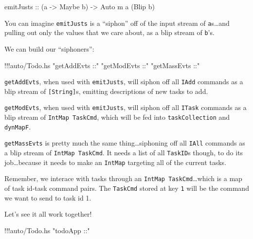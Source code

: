 \documentclass[]{article}
\newenvironment{Shaded}{}{}
\newcommand{\DataTypeTok}[1]{\textcolor[rgb]{0.56,0.13,0.00}{{#1}}}
\newcommand{\StringTok}[1]{\textcolor[rgb]{0.25,0.44,0.63}{{#1}}}
\newcommand{\OtherTok}[1]{\textcolor[rgb]{0.00,0.44,0.13}{{#1}}}
\newcommand{\FunctionTok}[1]{\textcolor[rgb]{0.02,0.16,0.49}{{#1}}}
\newcommand{\NormalTok}[1]{{#1}}
\begin{document}
\begin{Shaded}
\begin{Highlighting}[]
\OtherTok{emitJusts ::} \NormalTok{(a }\OtherTok{->} \DataTypeTok{Maybe} \NormalTok{b) }\OtherTok{->} \DataTypeTok{Auto} \NormalTok{m a (}\DataTypeTok{Blip} \NormalTok{b)}
\end{Highlighting}
\end{Shaded}

You can imagine \texttt{emitJusts} is a ``siphon'' off of the input
stream of \texttt{a}s\ldots{}and pulling out only the values that we
care about, as a blip stream of \texttt{b}'s.

We can build our ``siphoners'':

\begin{Shaded}
\begin{Highlighting}[]
\FunctionTok{!!!}\NormalTok{auto}\FunctionTok{/}\NormalTok{Todo.hs }\StringTok{"getAddEvts ::"} \StringTok{"getModEvts ::"} \StringTok{"getMassEvts ::"}
\end{Highlighting}
\end{Shaded}

\texttt{getAddEvts}, when used with \texttt{emitJusts}, will siphon off
all \texttt{IAdd} commands as a blip stream of \texttt{{[}String{]}}s,
emitting descriptions of new tasks to add.

\texttt{getModEvts}, when used with \texttt{emitJusts}, will siphon off
all \texttt{ITask} commands as a blip stream of
\texttt{IntMap\ TaskCmd}, which will be fed into \texttt{taskCollection}
and \texttt{dynMapF}.

\texttt{getMassEvts} is pretty much the same thing\ldots{}siphoning off
all \texttt{IAll} commands as a blip stream of \texttt{IntMap\ TaskCmd}.
It needs a list of all \texttt{TaskID}s though, to do its
job\ldots{}because it needs to make an \texttt{IntMap} targeting all of
the current tasks.

Remember, we interace with tasks through an
\texttt{IntMap\ TaskCmd}\ldots{}which is a map of task id-task command
pairs. The \texttt{TaskCmd} stored at key \texttt{1} will be the command
we want to send to task id 1.

Let's see it all work together!

\begin{Shaded}
\begin{Highlighting}[]
\FunctionTok{!!!}\NormalTok{auto}\FunctionTok{/}\NormalTok{Todo.hs }\StringTok{"todoApp ::"}
\end{Highlighting}
\end{Shaded}
\end{document}
